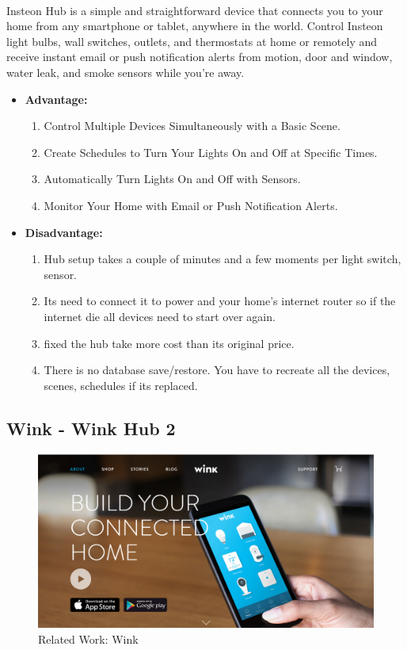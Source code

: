 \documentclass[a4paper, 12pt, oneside]{book}
\newcommand\boldcolor[1]{\textcolor{bold}{\textbf{#1}}}
\begin{document}
		\paragraph{}Insteon Hub is a simple and straightforward device that connects you to your home from any smartphone or tablet, anywhere in the world. Control Insteon light bulbs, wall switches, outlets, and thermostats at home or remotely and receive instant email or push notification alerts from motion, door and window, water leak, and smoke sensors while you’re away\cite{insteon}.
		\begin{itemize}
		\item \boldcolor{Advantage:}
			\begin{enumerate}
				\item Control Multiple Devices Simultaneously with a Basic Scene.
				\item Create Schedules to Turn Your Lights On and Off at Specific Times.
				\item Automatically Turn Lights On and Off with Sensors.
				\item Monitor Your Home with Email or Push Notification Alerts.
			\end{enumerate}
		\item \boldcolor{Disadvantage:} 
			\begin{enumerate}
				\item Hub setup takes a couple of minutes and a few moments per light switch, sensor.
				\item Its need to connect it to power and your home's internet router so if the internet die all devices need to start over again. 
				\item fixed the hub take more cost than its original price.
				\item There is no database save/restore. You have to recreate all the devices, scenes, schedules if its replaced.
			\end{enumerate}
		\end{itemize}
		\newpage	
		\subsection{Wink - Wink Hub 2}
		\begin{figure}[H]
  			\caption{Related Work: Wink}
  			\includegraphics[width=\linewidth]{img/wink.png}
		\end{figure}
\end{document}
